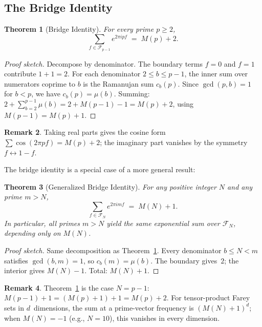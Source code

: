 \documentclass[11pt]{article}
\newtheorem{theorem}{Theorem}[section]
\theoremstyle{definition}
\newtheorem{remark}[theorem]{Remark}
\newcommand{\F}{\mathcal{F}}
\begin{document}
\subsection{The Bridge Identity}

\begin{theorem}[Bridge Identity]\label{thm:bridge}
For every prime $p \ge 2$,
\begin{equation}\label{eq:bridge}
  \sum_{f \in \F_{p-1}} e^{2\pi i p f}
  \;=\; M(p) + 2.
\end{equation}
\end{theorem}

\begin{proof}[Proof sketch]
Decompose by denominator.  The boundary terms $f = 0$ and $f = 1$
contribute $1 + 1 = 2$.  For each denominator $2 \le b \le p-1$,
the inner sum over numerators coprime to $b$ is the Ramanujan sum
$c_b(p)$.  Since $\gcd(p, b) = 1$ for $b < p$, we have
$c_b(p) = \mu(b)$.  Summing: $2 + \sum_{b=2}^{p-1} \mu(b) =
2 + M(p-1) - 1 = M(p) + 2$, using $M(p-1) = M(p) + 1$.
\end{proof}

\begin{remark}
Taking real parts gives the cosine form
$\sum \cos(2\pi pf) = M(p) + 2$;
the imaginary part vanishes by the symmetry $f \leftrightarrow 1 - f$.
\end{remark}

The bridge identity is a special case of a more general result:

\begin{theorem}[Generalized Bridge Identity]\label{thm:gen-bridge}
For any positive integer $N$ and any prime $m > N$,
\begin{equation}\label{eq:gen-bridge}
  \sum_{f \in \F_N} e^{2\pi i m f} \;=\; M(N) + 1.
\end{equation}
In particular, all primes $m > N$ yield the \emph{same}
exponential sum over $\F_N$, depending only on $M(N)$.
\end{theorem}

\begin{proof}[Proof sketch]
Same decomposition as Theorem~\ref{thm:bridge}.  Every
denominator $b \le N < m$ satisfies $\gcd(b, m) = 1$,
so $c_b(m) = \mu(b)$.  The boundary gives~$2$; the
interior gives $M(N) - 1$.  Total: $M(N) + 1$.
\end{proof}

\begin{remark}
Theorem~\ref{thm:bridge} is the case $N = p - 1$:
$M(p-1) + 1 = (M(p) + 1) + 1 = M(p) + 2$.
For tensor-product Farey sets in $d$~dimensions, the sum
at a prime-vector frequency is $(M(N)+1)^d$; when $M(N) = -1$
(e.g., $N = 10$), this vanishes in every dimension.
\end{remark}
\end{document}

